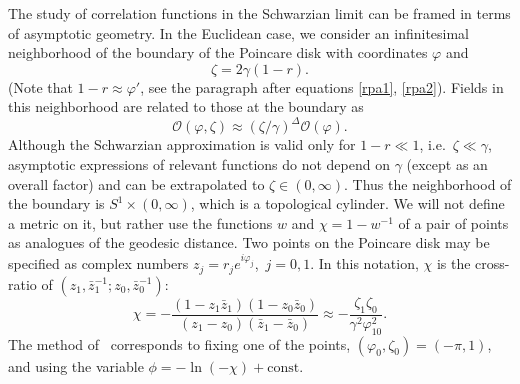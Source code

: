 \documentclass[12pt]{article}
\newcommand{\vp}{\varphi}
\newcommand{\calO}{\mathcal{O}}
\newcommand{\const}{\mathrm{const}}
\begin{document}
The study of correlation functions in the Schwarzian limit can be framed in terms of asymptotic geometry. In the Euclidean case, we consider an infinitesimal neighborhood of the boundary of the Poincare disk with coordinates $\vp$ and
\begin{equation}
\zeta=2\gamma(1-r).
\end{equation}
(Note that $1-r\approx\vp'$, see the paragraph after equations \eqref{rpa1}, \eqref{rpa2}). Fields in this neighborhood are related to those at the boundary as
\begin{equation}
\calO(\vp,\zeta)\approx(\zeta/\gamma)^{\Delta}\calO(\vp).
\end{equation}
Although the Schwarzian approximation is valid only for $1-r\ll 1$, i.e.\ $\zeta\ll\gamma$, asymptotic expressions of relevant functions do not depend on $\gamma$ (except as an overall factor) and can be extrapolated to $\zeta\in(0,\infty)$. Thus the neighborhood of the boundary is $S^1\times(0,\infty)$, which is a topological cylinder. We will not define a metric on it, but rather use the functions $w$ and $\chi=1-w^{-1}$ of a pair of points as analogues of the geodesic distance. Two points on the Poincare disk may be specified as complex numbers $z_j=r_je^{i\vp_j}$,\, $j=0,1$. In this notation, $\chi$ is the cross-ratio of $(z_1,\bar{z}_1^{-1};z_0,\bar{z}_0^{-1})$:
\begin{equation}
\chi=-\frac{(1-z_1\bar{z}_1)(1-z_0\bar{z}_0)}{(z_1-z_0)(\bar{z}_1-\bar{z}_0)}
\approx -\frac{\zeta_1\zeta_0}{\gamma^2\vp_{10}^2}.
\end{equation}
The method of~\cite{BaAlKa16,BaAlKa17} corresponds to fixing one of the points, $(\vp_0,\zeta_0)=(-\pi,1)$, and using the variable $\phi=-\ln(-\chi)+\const$.
\end{document}
